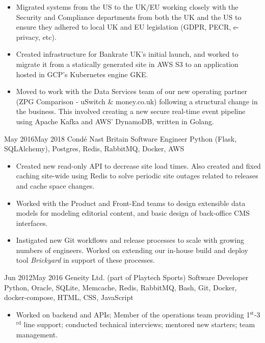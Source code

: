 \documentclass[10pt]{article} %
\begin{document}
{
      \begin{itemize}

      \item Migrated systems from the US to the UK/EU working closely with the Security
            and Compliance departments from both the UK and the US to ensure they
            adhered to local UK and EU legislation (GDPR, PECR, e-privacy, etc).

      \item Created infrastructure for Bankrate UK's initial launch, and worked
            to migrate it from a statically generated site in AWS S3 to an application hosted
            in GCP's Kubernetes engine GKE.

      \item Moved to work with the Data Services team of our new operating partner
            (ZPG Comparison - uSwitch \& money.co.uk) following a structural change
            in the business. This involved creating a new secure real-time event
            pipeline using Apache Kafka and AWS' DynamoDB, written in Golang.

  \end{itemize}

}
\jobheader
{May 2016}{May 2018}
{Condé Nast Britain}
{Software Engineer}
{
      Python (Flask, SQLAlchemy),
      Postgres,
      Redis,
      RabbitMQ,
      Docker,
      AWS
}
{
  \begin{itemize}

      \item Created new read-only API to decrease site load times. Also created and fixed
            caching site-wide using Redis to solve periodic site outages related to
            releases and cache space changes.

      \item Worked with the Product and Front-End teams to design extensible data models
            for modeling editorial content, and basic design of back-office CMS
            interfaces.

      \item Instigated new Git workflows and release processes to scale with growing
            numbers of engineers. Worked on extending our in-house build and deploy
            tool \textit{Brickyard} in support of these processes.

  \end{itemize}

}
\jobheader
{Jun 2012}{May 2016}
{Geneity Ltd. (part of Playtech Sports)}
{Software Developer}
{
      Python,
      Oracle, SQLite,
      Memcache, Redis,
      RabbitMQ,
      Bash,
      Git,
      Docker, docker-compose,
      HTML, CSS, JavaScript
}
{
      \begin{itemize}

      \item Worked on backend and APIs; Member of the operations team providing 1$^{\textrm{st}}$-3$^{\textrm{rd}}$ line support; conducted technical interviews; mentored new starters; team management.

      \end{itemize}
}
\end{document}
